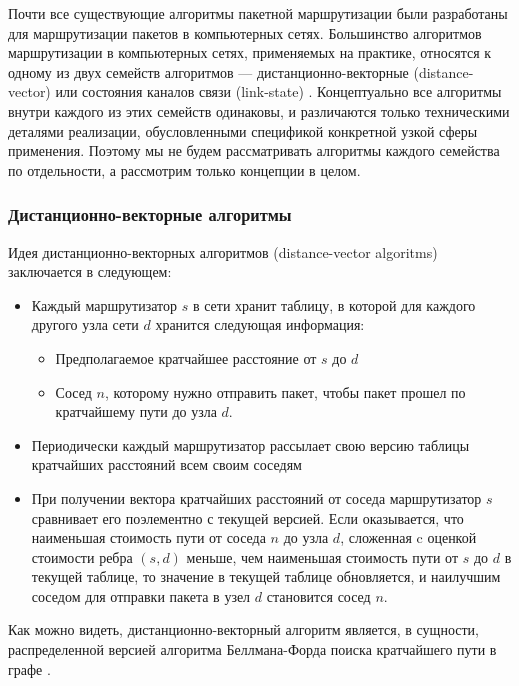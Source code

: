 \documentclass[specification,annotation,times]{itmo-student-thesis}
\theoremstyle{definition}
\begin{document}
Почти все существующие алгоритмы пакетной маршрутизации были разработаны для
маршрутизации пакетов в компьютерных сетях. Большинство алгоритмов маршрутизации
в компьютерных сетях, применяемых на практике, относятся к одному из двух
семейств алгоритмов --- дистанционно-векторные (distance-vector) \cite{arpanet-orig} или
состояния каналов связи (link-state) \cite{link-state-arpanet}.
Концептуально все алгоритмы внутри каждого из этих семейств одинаковы, и различаются только
техническими деталями реализации, обусловленными спецификой конкретной узкой
сферы применения. Поэтому мы не будем рассматривать алгоритмы каждого семейства
по отдельности, а рассмотрим только концепции в целом.

\subsubsection{Дистанционно-векторные алгоритмы}\label{overview:networks:dv}

Идея дистанционно-векторных алгоритмов (distance-vector algoritms) заключается в
следующем:

\begin{itemize}
\item Каждый маршрутизатор $s$ в сети хранит таблицу, в которой для каждого другого узла
  сети $d$ хранится следующая информация:
  \begin{itemize}
  \item Предполагаемое кратчайшее расстояние от $s$ до $d$
  \item Сосед $n$, которому нужно отправить пакет, чтобы пакет прошел по
    кратчайшему пути до узла $d$.
  \end{itemize}
\item Периодически каждый маршрутизатор рассылает свою версию таблицы кратчайших
  расстояний всем своим соседям
\item При получении вектора кратчайших расстояний от соседа маршрутизатор $s$
  сравнивает его поэлементно с текущей версией. Если оказывается, что наименьшая
  стоимость пути от соседа $n$ до узла $d$, сложенная c оценкой стоимости ребра
  $(s, d)$ меньше, чем наименьшая стоимость пути от $s$ до $d$ в текущей
  таблице, то значение в текущей таблице обновляется, и наилучшим соседом для
  отправки пакета в узел $d$ становится сосед $n$.
\end{itemize}

Как можно видеть, дистанционно-векторный алгоритм является, в сущности,
распределенной версией алгоритма Беллмана-Форда поиска кратчайшего пути в
графе \cite{bellman-ford}.
\end{document}
